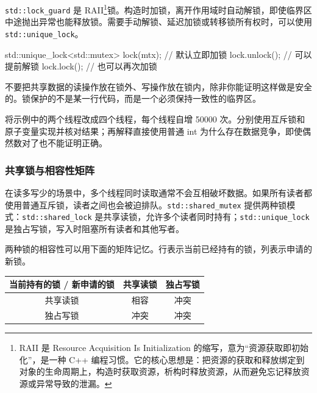 \texttt{std::lock\_guard} 是 RAII\footnote{
    RAII 是 Resource Acquisition Is Initialization 的缩写，意为“资源获取即初始化”，是一种 C++ 编程习惯。它的核心思想是：把资源的获取和释放绑定到对象的生命周期上，构造时获取资源，析构时释放资源，从而避免忘记释放资源或异常导致的泄漏。
}锁。构造时加锁，离开作用域时自动解锁，即使临界区中途抛出异常也能释放锁。需要手动解锁、延迟加锁或转移锁所有权时，可以使用 \texttt{std::unique\_lock}。

\begin{tcode}
std::unique_lock<std::mutex> lock(mtx);  // 默认立即加锁
lock.unlock();                           // 可以提前解锁
lock.lock();                             // 也可以再次加锁
\end{tcode}

\begin{note}
不要把共享数据的读操作放在锁外、写操作放在锁内，除非你能证明这样做是安全的。锁保护的不是某一行代码，而是一个必须保持一致性的临界区。
\end{note}

\begin{exercise}\label{ex:v1-cpp-counter}

将示例中的两个线程改成四个线程，每个线程自增 50000 次。分别使用互斥锁和原子变量实现并核对结果；再解释直接使用普通 int 为什么存在数据竞争，即使偶然数对了也不能证明正确。
\end{exercise}

\subsubsection{共享锁与相容性矩阵}
在读多写少的场景中，多个线程同时读取通常不会互相破坏数据。如果所有读者都使用普通互斥锁，读者之间也会被迫排队。\texttt{std::shared\_mutex} 提供两种锁模式：\texttt{std::shared\_lock} 是共享读锁，允许多个读者同时持有；\texttt{std::unique\_lock} 是独占写锁，写入时阻塞所有读者和其他写者。

两种锁的相容性可以用下面的矩阵记忆。行表示当前已经持有的锁，列表示申请的新锁。

\begin{center}
\begin{tabular}{c|cc}
\toprule[1.5pt]
当前持有的锁 / 新申请的锁 & 共享读锁 & 独占写锁 \\
\midrule[1pt]
共享读锁 & 相容 & 冲突 \\
独占写锁 & 冲突 & 冲突 \\
\bottomrule[1.5pt]
\end{tabular}
\end{center}


